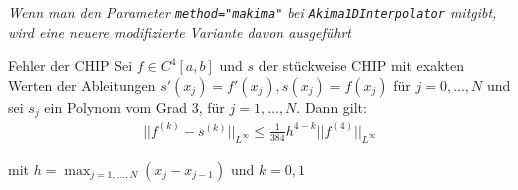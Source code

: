 \begin{footnotesize}
    \textit{Wenn man den Parameter \texttt{method="makima"} bei \texttt{Akima1DInterpolator} mitgibt, wird eine neuere modifizierte Variante davon ausgeführt}
\end{footnotesize}

\begin{theorem}[]{Fehler der CHIP}
    Sei $f \in C^4[a, b]$ und $s$ der stückweise CHIP mit exakten Werten der Ableitungen $s'(x_j) = f'(x_j), s(x_j) = f(x_j)$ für $j = 0, \ldots, N$
    und sei $s_j$ ein Polynom vom Grad $3$, für $j = 1, \ldots, N$. Dann gilt:
    \rmvspace
    \begin{align*}
        ||f^{(k)} - s^{(k)}||_{L^\infty} \leq \frac{1}{384} h^{4 - k} ||f^{(4)}||_{L^\infty}
    \end{align*}

    \rmvspace
    mit $h = \max_{j = 1, \ldots, N} (x_j - x_{j - 1})$ und $k = 0, 1$
\end{theorem}
